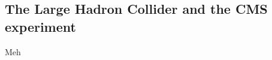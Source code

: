 \begin{tcolorbox}[breakable,colback=black!5!white,colframe=red!80!black,width=\textwidth]
\chapter{The Large Hadron Collider and the CMS experiment}
\end{tcolorbox}
\label{chap:LHC_CMS}

Meh
\clearpage

